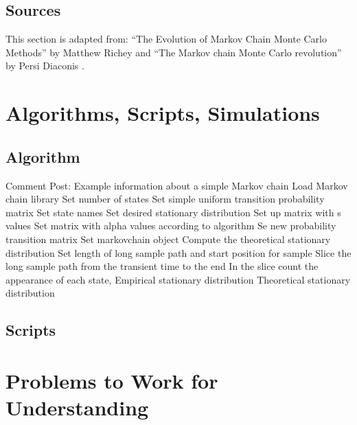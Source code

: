 \documentclass[12pt]{article}
\begin{document}
\subsection*{Sources} This section is adapted from:  ``The Evolution of
Markov Chain Monte Carlo Methods'' by Matthew Richey
\cite{richey10} and ``The Markov chain Monte Carlo revolution'' by Persi
Diaconis
\cite{diaconis09}.

\hr

\section*{Algorithms, Scripts, Simulations}

\subsection*{Algorithm}

\begin{codebox}
  \zi Comment Post:  Example
  information about a simple Markov chain
    \li Load Markov chain library
    \li Set number of states
    \li Set simple uniform transition probability matrix
    \li Set state names
    \li Set desired stationary distribution
    \li Set up matrix with s values
    \li Set matrix with alpha values according to algorithm
    \li Se new probability transition matrix
    \li Set markovchain object
    \li Compute the theoretical stationary distribution
    \li Set length of long sample path and start position for sample
    \li Slice the long sample path from the transient time to the end
    \li In the slice count the appearance of each state,
     \li \Return Empirical stationary distribution
    \li \Return Theoretical stationary distribution
\end{codebox}
\subsection*{Scripts}



\hr

\section*{Problems to Work for Understanding}
\renewcommand{\theexerciseseries}{}
\renewcommand{\theexercise}{\arabic{exercise}}
\end{document}
